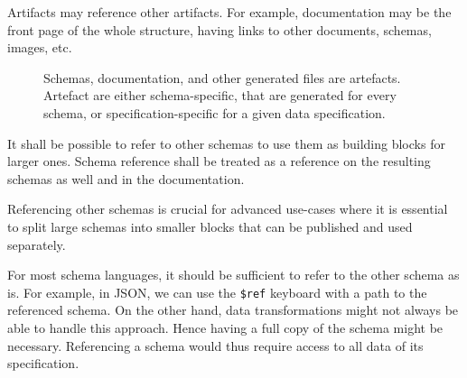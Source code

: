 Artifacts may reference other artifacts. For example, documentation may be the front page of the whole structure, having links to other documents, schemas, images, etc.

\begin{figure}[h!]\centering
  \caption{Schemas, documentation, and other generated files are artefacts. Artefact are either schema-specific, that are generated for every schema, or specification-specific for a given data specification.}
\end{figure}



\begin{requirement}
  It shall be possible to refer to other schemas to use them as building blocks for larger ones. Schema reference shall be treated as a reference on the resulting schemas as well and in the documentation.
  \label{analysis/requirement/schema-reference}
\end{requirement}

Referencing other schemas is crucial for advanced use-cases where it is essential to split large schemas into smaller blocks that can be published and used separately.

For most schema languages, it should be sufficient to refer to the other schema as is. For example, in JSON, we can use the \verb|$ref| keyboard with a path to the referenced schema. On the other hand, data transformations might not always be able to handle this approach. Hence having a full copy of the schema might be necessary. Referencing a schema would thus require access to all data of its specification.

